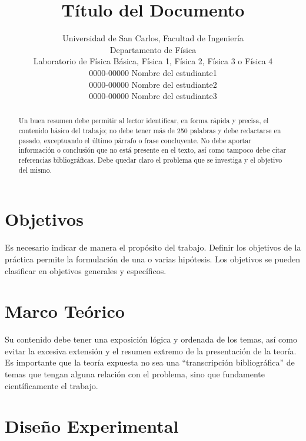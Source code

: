 \documentclass[10pt,journal]{IEEEtran}
\begin{document}
\title{Título del Documento}

\author{Universidad de San Carlos, Facultad de Ingeniería\\
Departamento de Física\\ Laboratorio de Física Básica, Física 1, Física 2, Física 3 o Física 4\\
0000-00000 Nombre del estudiante1\\ 0000-00000 Nombre del estudiante2\\ 0000-00000 Nombre del estudiante3 }




\maketitle{}  

\begin{abstract}
  
Un buen resumen debe permitir al lector identificar, en forma rápida y precisa, el
contenido básico del trabajo; no debe tener más de 250 palabras y debe redactarse en
pasado, exceptuando el último párrafo o frase concluyente. No debe aportar información
o conclusión que no está presente en el texto, así como tampoco debe citar referencias
bibliográficas. Debe quedar claro el problema que se investiga y el objetivo del mismo.

\end{abstract}

\section{Objetivos}
 
Es necesario indicar de manera el propósito del trabajo. Definir los objetivos de la
práctica permite la formulación de una o varias hipótesis. Los objetivos se pueden
clasificar en objetivos generales y específicos.


\section{Marco Teórico}
Su contenido debe tener una exposición lógica y ordenada de los temas, así como
evitar la excesiva extensión y el resumen extremo de la presentación de la teoría. Es
importante que la teoría expuesta no sea una “transcripción bibliográfica” de temas
que tengan alguna relación con el problema, sino que fundamente científicamente el
trabajo.

\section{Diseño Experimental}
\end{document}
